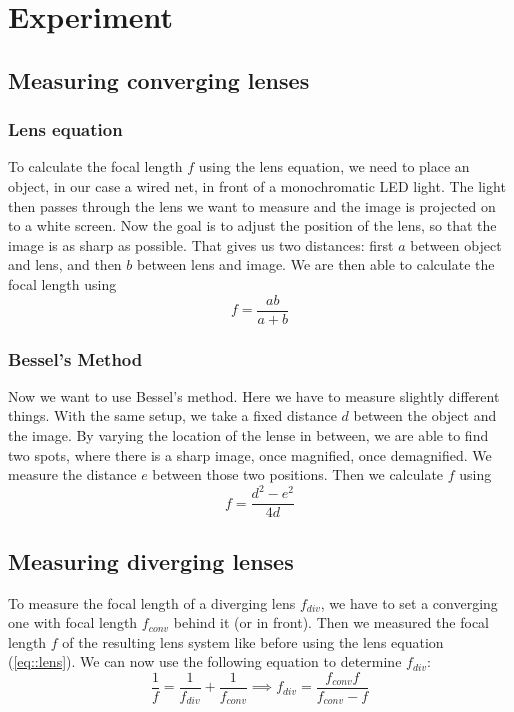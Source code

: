\section{Experiment}

\subsection{Measuring converging lenses}
\subsubsection{Lens equation}
To calculate the focal length $f$ using the lens equation, we need to place an object, in our case a wired net, in front of a monochromatic LED light. 
The light then passes through the lens we want to measure and the image is projected on to a white screen.
Now the goal is to adjust the position of the lens, so that the image is as sharp as possible.
That gives us two distances:
first $a$ between object and lens, and then $b$ between lens and image.
We are then able to calculate the focal length using
\begin{equation}
	\displaystyle f = \frac{ab}{a+b}
	\label{eq::lens}
\end{equation}





\subsubsection{Bessel's Method}
Now we want to use Bessel's method.
Here we have to measure slightly different things.
With the same setup, we take a fixed distance $d$ between the object and the image. 
By varying the location of the lense in between, we are able to find two spots, where there is a sharp image, once magnified, once demagnified.
We measure the distance $e$ between those two positions. Then we calculate $f$ using
\begin{equation}
	f = \frac{d^2 - e^2}{4d}
	\label{eq::bessel}
\end{equation}


\subsection{Measuring diverging lenses}
To measure the focal length of a diverging lens $f_{div}$, we have to set a converging one with focal length $f_{conv}$ behind it (or in front). 
Then we measured the focal length $f$ of the resulting lens system like before using the lens equation (\ref{eq::lens}).
We can now use the following equation to determine $f_{div}$:
\begin{equation}
	\frac{1}{f} = \frac{1}{f_{div}} + \frac{1}{f_{conv}} \implies f_{div} = \frac{f_{conv} f}{f_{conv} - f}
	\label{eq::div}
\end{equation}


